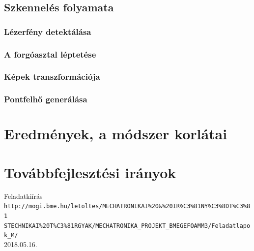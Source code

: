 \documentclass[12pt,a4paper]{article}
\begin{document}
\subsection{Szkennelés folyamata}
\subsubsection{Lézerfény detektálása}
\subsubsection{A forgóasztal léptetése}
\subsubsection{Képek transzformációja}
\subsubsection{Pontfelhő generálása}
\section{Eredmények, a módszer korlátai}
\section{Továbbfejlesztési irányok}
\newpage
\begin{thebibliography}{9} 
Feladatkiírás\\
\texttt{http://mogi.bme.hu/letoltes/MECHATRONIKAI\%20\&\%20IR\%C3\%81NY\%C3\%8DT\%C3\%81\\
STECHNIKAI\%20T\%C3\%81RGYAK/MECHATRONIKA\_PROJEKT\_BMEGEFOAMM3/Feladatlapok\_M/}\\
2018.05.16.
\end{thebibliography}
\end{document}
